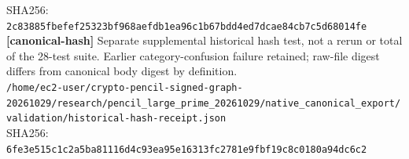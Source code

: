 \documentclass[11pt]{article}
\begin{document}
SHA256: \texttt{2c83885fbefef25323bf968aefdb1ea96c1b67bdd4ed7dcae84cb7c5d68014fe}\\
\textbf{[canonical-hash]} Separate supplemental historical hash test, not a rerun or total of the 28-test suite. Earlier category-confusion failure retained; raw-file digest differs from canonical body digest by definition.\\
\texttt{/\allowbreak{}home/\allowbreak{}ec2-user/\allowbreak{}crypto-pencil-signed-graph-20261029/\allowbreak{}research/\allowbreak{}pencil\_large\_prime\_20261029/\allowbreak{}native\_canonical\_export/\allowbreak{}validation/\allowbreak{}historical-hash-receipt.json}\\
SHA256: \texttt{6fe3e515c1c2a5ba81116d4c93ea95e16313fc2781e9fbf19c8c0180a94dc6c2}\\
\end{document}
